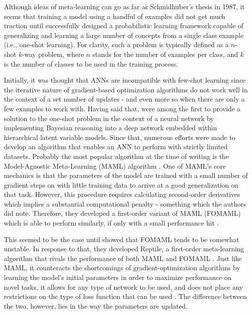 \documentclass[a4paper]{book}
\begin{document}
Although ideas of meta-learning can go as far as Schmidhuber's thesis in 1987, it seems that training a model using a handful of examples did not get much traction until \textcite{lake_human-level_2015} successfully designed a probabilistic learning framework capable of generalizing and learning a large number of concepts from a single class example (i.e., one-shot learning). For clarity, such a problem is typically defined as a $n$-shot $k$-way problem, where $n$ stands for the number of examples per class, and $k$ is the number of classes to be used in the training process.

Initially, it was thought that ANNs are incompatible with few-shot learning since the iterative nature of gradient-based optimization algorithms do not work well in the context of a set number of updates \parencite{ravi_optimization_2016} - and even more so when there are only a few examples to work with. Having said that, \textcite{rezende_one-shot_2016} were among the first to provide a solution to the one-shot problem in the context of a neural network by implementing Bayesian reasoning into a deep network embedded within hierarchical latent variable models. Since that, numerous efforts were made to develop an algorithm that enables an ANN to perform with strictly limited datasets. Probably the most popular algorithm at the time of writing is the Model-Agnostic Meta-Learning (MAML) algorithm \parencite{finn_model-agnostic_2017}. One of MAML's core mechanics is that the parameters of the model are trained with a small number of gradient steps on with little training data to arrive at a good generalization on that task. However, this procedure requires calculating second-order derivatives which implies a substantial computational penalty - something which the authors did note. Therefore, they developed a first-order variant of MAML (FOMAML) which is able to perform similarly, if only with a small performance hit \parencite{finn_model-agnostic_2017}.

This seemed to be the case until \textcite{nichol_first-order_2018} showed that FOMAML tends to be somewhat unstable. In response to that, they developed Reptile, a first-order meta-learning algorithm that rivals the performance of both MAML and FOMAML \parencite{nichol_first-order_2018}. Just like MAML, it counteracts the shortcomings of gradient-optimization algorithms by learning the model's initial parameters in order to maximize performance on novel tasks, it allows for any type of network to be used, and does not place any restrictions on the type of loss function that can be used \parencite{nichol_first-order_2018}. The difference between the two, however, lies in the way the parameters are updated. 
\end{document}
